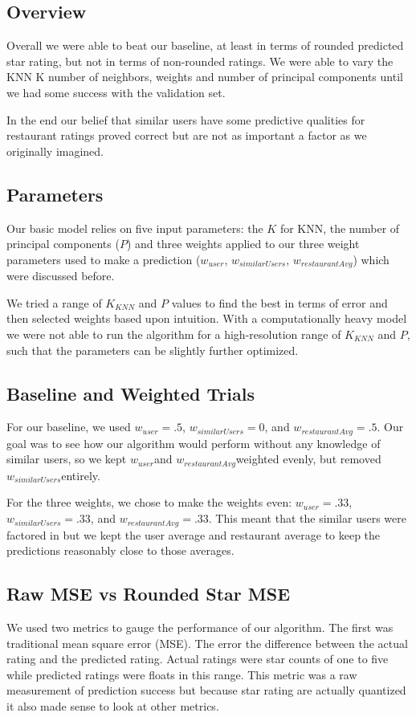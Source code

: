 \documentclass[10pt,twocolumn,letterpaper]{article}
\newcommand{\wu}{\ensuremath{w_{user}}}
\newcommand{\ws}{\ensuremath{w_{similarUsers}}}
\newcommand{\wrst}{\ensuremath{w_{restaurantAvg}}}
\begin{document}
\subsection{Overview}
Overall we were able to beat our baseline, at least in terms of rounded predicted star rating, but not in terms of non-rounded ratings. We were able to vary the KNN K number of neighbors, weights and number of principal components until we had some success with the validation set.

In the end our belief that similar users have some predictive qualities for restaurant ratings proved correct but are not as important a factor as we originally imagined.

\subsection{Parameters}
Our basic model relies on five input parameters: the $K$ for KNN, the number of principal components ($P$) and three weights applied to our three weight parameters used to make a prediction (\wu, \ws, \wrst) which were discussed before.

We tried a range of $K_{KNN}$ and $P$ values to find the best in terms of error and then selected weights based upon intuition. With a computationally heavy model we were not able to run the algorithm for a high-resolution range of $K_{KNN}$ and $P$, such that the parameters can be slightly further optimized.

\subsection{Baseline and Weighted Trials}

For our baseline, we used $\wu=.5$, $\ws=0$, and $\wrst=.5$. Our goal was to see how our algorithm would perform without any knowledge of similar users, so we kept \wu and \wrst weighted evenly, but removed \ws entirely.

For the three weights, we chose to make the weights even: $\wu=.33$, $\ws=.33$, and $\wrst=.33$. This meant that the similar users were factored in but we kept the user average and restaurant average to keep the predictions reasonably close to those averages.

\subsection{Raw MSE vs Rounded Star MSE}
We used two metrics to gauge the performance of our algorithm. The first was traditional mean square error (MSE). The error the difference between the actual rating and the predicted rating. Actual ratings were star counts of one to five while predicted ratings were floats in this range. This metric was a raw measurement of prediction success but because star rating are actually quantized it also made sense to look at other metrics.
\end{document}
